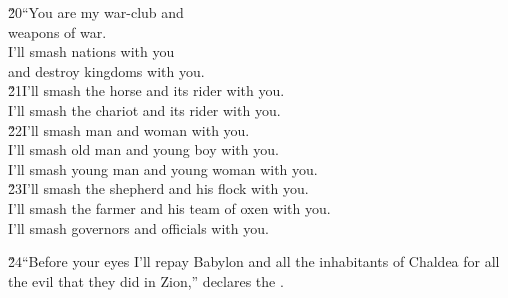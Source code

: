 \begin{poetry}
\poeml \v{20}``You are my war-club and \\
\poemll    weapons of war. \\
\poeml I'll smash nations with you \\
\poemll    and destroy kingdoms with you. \\
\poeml \v{21}I'll smash the horse and its rider with you. \\
\poemll    I'll smash the chariot and its rider with you. \\
\poeml \v{22}I'll smash man and woman with you. \\
\poemll    I'll smash old man and young boy with you. \\
\poemlll       I'll smash young man and young woman with you. \\
\poeml \v{23}I'll smash the shepherd and his flock with you. \\
\poemll    I'll smash the farmer and his team of oxen with you. \\
\poemlll       I'll smash governors and officials with you.
\end{poetry}

\v{24}``Before your eyes I'll repay Babylon and all the inhabitants of Chaldea for all the evil that they did in Zion,'' declares the .

